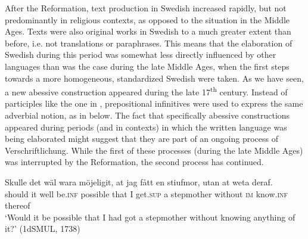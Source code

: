 \documentclass[output=paper]{langscibook}
\begin{document}
After the Reformation, text production in Swedish increased rapidly, but not predominantly in religious contexts, as opposed to the situation in the Middle Ages. Texts were also original works in Swedish to a much greater extent than before, i.e. not translations or paraphrases. This means that the elaboration of Swedish during this period was somewhat less directly influenced by other languages than was the case during the late Middle Ages, when the first steps towards a more homogeneous, standardized Swedish were taken. As we have seen, a new abessive construction appeared during the late 17\textsuperscript{th} century. Instead of participles like the one in , prepositional infinitives were used to express the same adverbial notion, as in  below. The fact that specifically abessive constructions appeared during periods (and in contexts) in which the written language was being elaborated might suggest that they are part of an ongoing process of Verschriftlichung. While the first of these processes (during the late Middle Ages) was interrupted by the Reformation, the second process has continued. 


\ea
\label{ex:kalm:34}
 \gll Skulle det wäl wara möjeligit, at jag fått en stiufmor, utan at weta deraf.\\
should it well be.\textsc{inf} possible that I get.\textsc{sup} a stepmother without \textsc{im} know.\textsc{inf} thereof\\
\glt ‘Would it be possible that I had got a stepmother without knowing anything of it?’ (1dSMUL, 1738)
\z
\end{document}
